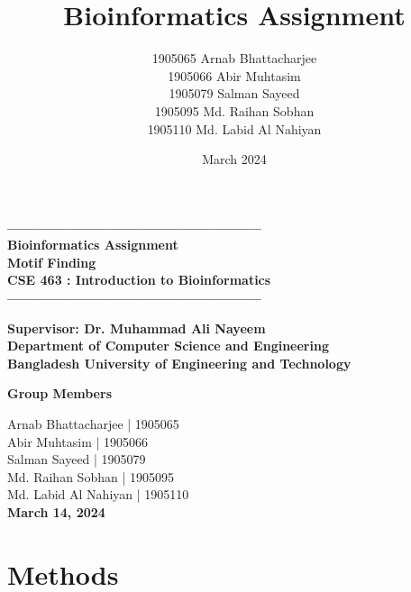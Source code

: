 \documentclass{report}
\title{Bioinformatics Assignment}
\author{
1905065 Arnab Bhattacharjee\\
1905066 Abir Muhtasim\\
1905079 Salman Sayeed\\
1905095 Md. Raihan Sobhan\\
1905110 Md. Labid Al Nahiyan\\
}
\date{March 2024}
\begin{document}
\begin{titlepage}
    \centering

    \vspace*{2cm}
    {\LARGE \textbf{-----------------------------------------------------}}\\
    \vspace{1cm}
    {\LARGE \textbf{Bioinformatics Assignment \\ Motif Finding}}\\
    \vspace{0.5cm}
    {\large \textbf{CSE 463 : Introduction to Bioinformatics}}\\
    \vspace{1cm}
    {\LARGE \textbf{-----------------------------------------------------}}\\
    \vspace{0.5cm} 
    
    {\large \textbf{Supervisor: Dr. Muhammad Ali Nayeem}}\\
    \vspace{1cm}
    {\large \textbf{Department of Computer Science and Engineering}}\\
    \vspace{0.5cm}
    {\large \textbf{Bangladesh University of Engineering and Technology}}\\
    \vspace{2cm}
    
    \textbf{Group Members}
    
    \vspace{0.5cm}
    

        Arnab Bhattacharjee | 1905065\\
        Abir Muhtasim | 1905066\\
        Salman Sayeed | 1905079\\
        Md. Raihan Sobhan | 1905095\\
        Md. Labid Al Nahiyan | 1905110\\
            
    \vspace{2cm}
    \textbf{March 14, 2024}\\ 

\end{titlepage}
\clearpage

\tableofcontents

\chapter{Methods}
\end{document}
